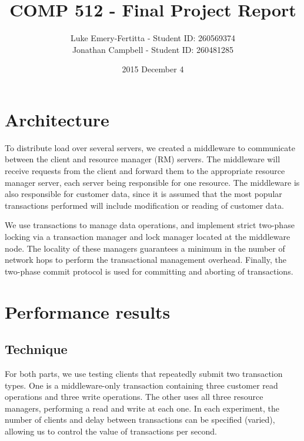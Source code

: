\documentclass[11pt]{article}
\begin{document}
\title{COMP 512 - Final Project Report}
\author{Luke Emery-Fertitta - Student ID: 260569374 \\ Jonathan Campbell - Student ID: 260481285}
\date{2015 December 4}
\maketitle

\section*{Architecture}

To distribute load over several servers, we created a middleware to communicate between the client and resource manager (RM) servers. The middleware will receive requests from the client and forward them to the appropriate resource manager server, each server being responsible for one resource. The middleware is also responsible for customer data, since it is assumed that the most popular transactions performed will include modification or reading of customer data.  \par

We use transactions to manage data operations, and implement strict two-phase locking via a transaction manager and lock manager located at the middleware node. The locality of these managers guarantees a minimum in the number of network hops to perform the transactional management overhead. Finally, the two-phase commit protocol is used for committing and aborting of transactions. \par

\section*{Performance results}

\subsection*{Technique}

For both parts, we use testing clients that repeatedly submit two transaction types. One is a middleware-only transaction containing three customer read operations and three write operations. The other uses all three resource managers, performing a read and write at each one. In each experiment, the number of clients and delay between transactions can be specified (varied), allowing us to control the value of transactions per second.
\end{document}
